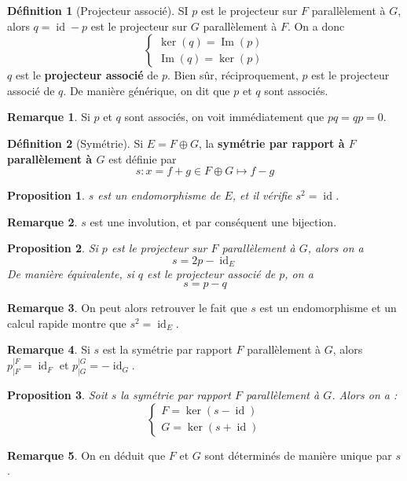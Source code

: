 \documentclass[french]{book}
\theoremstyle{plain}
\newtheorem{prop}{Proposition}[chapter]
\theoremstyle{definition}
\newtheorem{dfn}{Définition}[chapter]
\newtheorem{rmq}{Remarque}[chapter]
\theoremstyle{remark}
\DeclareMathOperator{\id}{id}
\DeclareMathOperator{\im}{Im}
\begin{document}
\begin{dfn}[Projecteur associé]
	SI $p$ est le projecteur sur $F$ parallèlement à $G$, alors $q=\id-p$ est le projecteur sur $G$ parallèlement à $F$. On a donc $$\left \{\begin{array}{ll}\ker(q)=\im(p)\\ \im(q)=\ker(p)\end{array}\right.$$ $q$ est le \textbf{projecteur associé} de $p$. Bien sûr, réciproquement, $p$ est le projecteur associé de $q$. De manière générique, on dit que $p$ et $q$ sont associés.
\end{dfn}
\begin{rmq}
	Si $p$ et $q$ sont associés, on voit immédiatement que $pq=qp=0$.
\end{rmq}
\begin{dfn}[Symétrie]
	Si $E=F\oplus G$, la \textbf{symétrie par rapport à $F$ parallèlement à $G$} est définie par $$s:x=f+g\in F\oplus G\mapsto f-g$$
\end{dfn}
\begin{prop}
	$s$ est un endomorphisme de $E$, et il vérifie $s^2=\id$.
\end{prop}
\begin{rmq}
	$s$ est une involution, et par conséquent une bijection.
\end{rmq}
\begin{prop}
	Si $p$ est le projecteur sur $F$ parallèlement à $G$, alors on a $$s=2p-\id_E$$ De manière équivalente, si $q$ est le projecteur associé de $p$, on a $$s=p-q$$
\end{prop}
\begin{rmq}
	On peut alors retrouver le fait que $s$ est un endomorphisme et un calcul rapide montre que $s^2=\id_E$.
\end{rmq}
\begin{rmq}
	Si $s$ est la symétrie par rapport $F$ parallèlement à $G$, alors $\displaystyle p_{|F}^{|F}=\id_F$ et $\displaystyle p_{|G}^{|G}=-\id_G$.
\end{rmq}
\begin{prop}
Soit $s$ la symétrie par rapport $F$ parallèlement à $G$. Alors on a : $$\left \{\begin{array}{ll}F=\ker(s-\id)\\ G=\ker(s+\id)\end{array}\right.$$
\end{prop}
\begin{rmq}
	On en déduit que $F$ et $G$ sont déterminés de manière unique par $s$.
\end{rmq}
\end{document}
